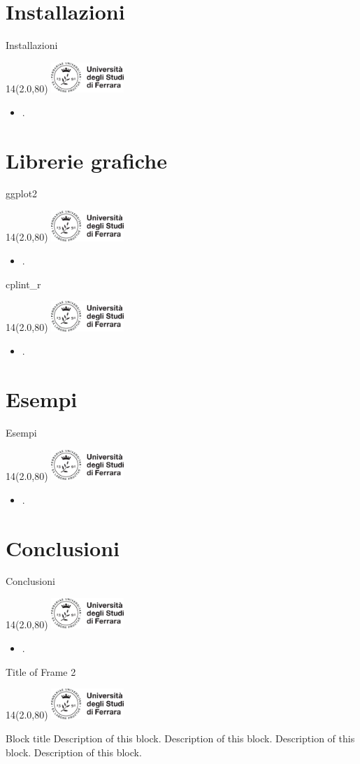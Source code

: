 \documentclass[11pt,xcolor={dvipsnames},default]{beamer} %
\newcommand{\MyLogo}{%
\begin{textblock}{14}(2.0,80)
 \includegraphics[height=1.15cm, angle=0]{logo}
\end{textblock}
}
\begin{document}
\section{Installazioni}
\begin{frame}{Installazioni}
\transboxin
\MyLogo
\begin{itemize}
\item .
\end{itemize}
\end{frame}

\section{Librerie grafiche}
\begin{frame}{ggplot2}
\transboxin
\MyLogo
\begin{itemize}
\item .
\end{itemize}
\end{frame}

\begin{frame}{cplint\_r}
\transboxin
\MyLogo
\begin{itemize}
\item .
\end{itemize}
\end{frame}

\section{Esempi}
\begin{frame}{Esempi}
\transboxin
\MyLogo
\begin{itemize}
\item .
\end{itemize}
\end{frame}

\section{Conclusioni}
\begin{frame}{Conclusioni}
\transboxin
\MyLogo
\begin{itemize}
\item .
\end{itemize}
\end{frame}






\iffalse
\begin{frame}{Title of Frame 2}
\MyLogo
\begin{center}
\begin{alertblock}{Block title}
Description of this block. Description of this block. Description of this block. Description of this block. \\
\end{alertblock}
\vspace{0.8cm}
\end{center}
\end{frame}
\end{document}
